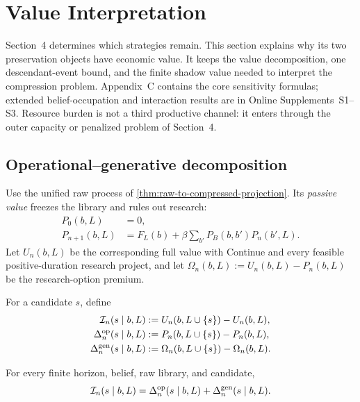 \clearpage
\section{Value Interpretation}\label{sec:value}

Section~4 determines which strategies remain.  This section explains why its
two preservation objects have economic value.  It keeps the value
decomposition, one descendant-event bound, and the finite shadow value needed
to interpret the compression problem.  Appendix~C contains the core
sensitivity formulas; extended belief-occupation and interaction results are
in Online Supplements~S1--S3.  Resource burden is not a third productive
channel: it enters through the outer capacity or penalized problem of
Section~4.

\subsection{Operational--generative decomposition}

Use the unified raw process of \cref{thm:raw-to-compressed-projection}.  Its
\emph{passive value} freezes the library and rules out research:
\begin{align}
 P_0(b,L)&=0,\nonumber\\
 P_{n+1}(b,L)&=F_L(b)+\beta
   \sum_{b'}P_B(b,b')P_n(b',L).\label{eq:passive-value}
\end{align}
Let \(U_n(b,L)\) be the corresponding full value with Continue and every
feasible positive-duration research project, and let
\(\Omega_n(b,L):=U_n(b,L)-P_n(b,L)\) be the research-option premium.

\begin{definition}
\label{def:innovation-components}
For a candidate \(s\), define
\begin{align}
 \mathcal I_n(s\mid b,L)
   &:=U_n(b,L\cup\{s\})-U_n(b,L),\label{eq:total-innovation}\\
 \Delta^{\mathrm{op}}_n(s\mid b,L)
   &:=P_n(b,L\cup\{s\})-P_n(b,L),\label{eq:operational-innovation}\\
 \Delta^{\mathrm{gen}}_n(s\mid b,L)
   &:=\Omega_n(b,L\cup\{s\})-\Omega_n(b,L).
   \label{eq:generative-innovation}
\end{align}
\end{definition}

\begin{theorem}
\label{thm:value-decomposition}
For every finite horizon, belief, raw library, and candidate,
\begin{equation}\label{eq:value-decomposition}
 \mathcal I_n(s\mid b,L)
 =\Delta^{\mathrm{op}}_n(s\mid b,L)+\Delta^{\mathrm{gen}}_n(s\mid b,L).
\end{equation}
\end{theorem}

